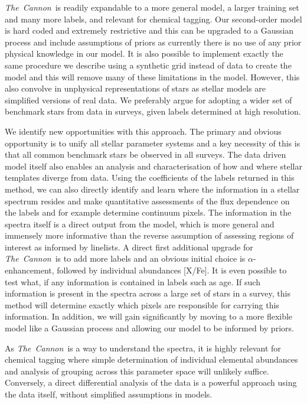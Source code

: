 \documentclass[12pt, preprint]{aastex}
\newcommand{\tc}{\textsl{The~Cannon}}
\begin{document}
\tc\ is readily expandable to a more general model, a larger training set and many more labels, and relevant for chemical tagging. 
Our second-order model is hard coded and extremely restrictive and this can be upgraded to a Gaussian process and include assumptions of priors as currently there is no use of any prior physical knowledge in our model. It is also possible to implement exactly the same procedure we describe using a synthetic grid instead of data to create the model and this will remove many of these limitations in the model. However, this also convolve in unphysical representations of stars as stellar models are simplified versions of real data. We preferably argue for adopting a wider set of benchmark stars from data in surveys, given labels determined at high resolution. 

We identify new opportunities with this approach. The primary and obvious opportunity is to unify all stellar parameter systems and a key necessity of this is that all common benchmark stars be observed in all surveys. The data driven model itself also enables an analysis and characterisation of how and where stellar templates diverge from data. Using the coefficients of the labels returned in this method, we can also directly identify and learn where the information in a stellar spectrum resides and make quantitative assessments of the flux dependence on the labels and for example determine continuum pixels. The information in the spectra itself is a direct output from the model, which is more general and immensely more informative than the reverse assumption of assessing regions of interest as informed by linelists.  A direct first additional upgrade for \tc\ is  to add more labels and an obvious initial choice is $\alpha$-enhancement, followed by individual abundances [X/Fe]. It is even possible to test what, if any information is contained in labels such as age. If such information is present in the spectra across a large set of stars in a survey, this method will determine exactly which pixels are responsible for carrying this information. In addition, we will gain significantly by moving to a more flexible model like a Gaussian process and allowing our model to be informed by priors.

As \tc\ is a way to understand the spectra, it is highly relevant for chemical tagging where simple determination of individual elemental abundances and analysis of grouping across this parameter space will unlikely suffice. Conversely, a direct differential analysis of the data is a powerful approach using the data itself, without simplified assumptions in models. 
\end{document}
